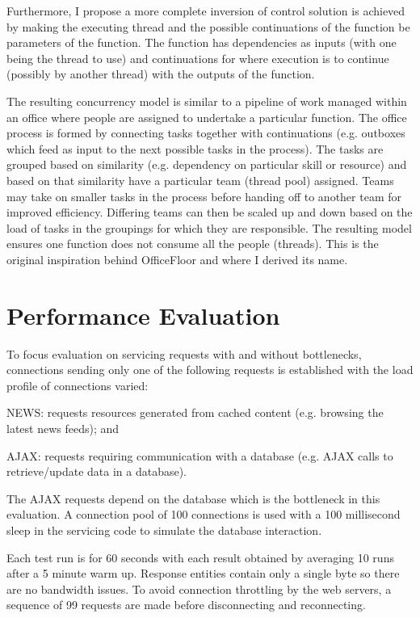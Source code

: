 \documentclass[conference]{ieee/IEEEtran}
\begin{document}
Furthermore, I propose a more complete inversion of control solution is achieved
by making the executing thread and the possible continuations of the function be
parameters of the function.  The function has dependencies as inputs (with one
being the thread to use) and continuations for where execution is to continue
(possibly by another thread) with the outputs of the function.

The resulting concurrency model is similar to a pipeline of work managed within
an office where people are assigned to undertake a particular function.
The office process is formed by connecting tasks together with continuations
(e.g. outboxes which feed as input to the next possible tasks in the process).
The tasks are grouped based on similarity (e.g. dependency on particular skill
or resource) and based on that similarity have a particular team (thread pool)
assigned.  Teams may take on smaller tasks in the process before handing off to
another team for improved efficiency.  Differing teams can then be scaled up and
down based on the load of tasks in the groupings for which they are responsible.
The resulting model ensures one function does not consume all the people
(threads).  This is the original inspiration behind OfficeFloor and where I
derived its name.



\section{Performance Evaluation}
To focus evaluation on servicing requests with and without bottlenecks,
connections sending only one of the following requests is established with the
load profile of connections varied:
\begin{IEEEitemize}
\item NEWS: requests resources generated from cached content (e.g. browsing the
latest news feeds); and
\item AJAX: requests requiring communication with a database (e.g. AJAX calls to
retrieve/update data in a database).
\end{IEEEitemize}

The AJAX requests depend on the database which is the bottleneck in this
evaluation.  A connection pool of 100 connections is used with a 100 millisecond
sleep in the servicing code to simulate the database interaction.

Each test run is for 60 seconds with each result obtained by averaging 10 runs
after a 5 minute warm up.  Response entities contain only a single byte so there
are no bandwidth issues.  To avoid connection throttling by the web servers, a
sequence of 99 requests are made before disconnecting and reconnecting.
\end{document}
